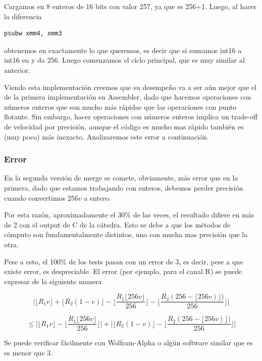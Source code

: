 Cargamos en  8 enteros de 16 bits con valor 257, ya que es 256+1.
Luego, al hacer la diferencia

\begin{lstlisting}
psubw xmm4, xmm3
\end{lstlisting}

obtenemos en  exactamente lo que queremos, es decir que si sumamos int16 a int16 en  y  da 256. Luego comenzamos el ciclo principal, que es muy similar al anterior.

Viendo esta implementación creemos que su desempeño va a ser aún mejor que el de la primera implementación en Assembler, dado que hacemos operaciones con números enteros que son mucho más rápidas que las operaciones con punto flotante. Sin embargo, hacer operaciones con números enteros implica un trade-off de velocidad por precisión, aunque el código es mucho mas rápido también es (muy poco) más inexacto. Analizaremos este error a continuación.

\subsubsection{Error}

En la segunda versión de merge se comete, obviamente, más error que en la primera, dado que estamos trabajando con enteros, debemos perder precisión cuando convertimos $256v$ a entero.

Por esta razón, aproximadamente el 30\% de las veces, el resultado difiere en más de 2 con el output de C de la cátedra. Esto se debe a que los métodos de cómputo son fundamentalmente distintos, uno con mucha mas precisión que la otra.

Pese a esto, el 100\% de los tests pasan con un error de 3, es decir, pese a que existe error, es despreciable. El error (por ejemplo, para el canal R) se puede expresar de la siguiente manera

$$\bigg|\lfloor R_1v\rfloor + \lfloor R_2(1-v) \rfloor
  -\bigg\lfloor \frac{R_1\lfloor 256v \rfloor}{256} \bigg\rfloor 
 -\bigg\lfloor \frac{R_2(256- \lfloor 256v) \rfloor)}{256} \bigg\rfloor\bigg| $$


$$\leq
\bigg|
\lfloor R_1v\rfloor - \bigg\lfloor \frac{R_1\lfloor 256v \rfloor}{256} \bigg\rfloor
\bigg|
+
\bigg|
\lfloor R_2(1-v) \rfloor -\bigg\lfloor \frac{R_2(256- \lfloor 256v) \rfloor)}{256} \bigg\rfloor
\bigg| $$

Se puede verificar fácilmente con Wolfram-Alpha o algún software similar que es es menor que 3.

